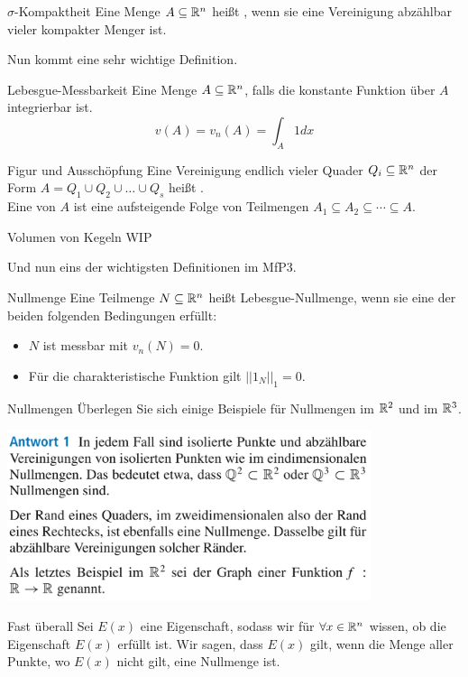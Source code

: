 \begin{Def}{$\sigma$-Kompaktheit}
    Eine Menge $A\subseteq \mathbb{R}^n$ heißt , wenn sie eine Vereinigung abzählbar vieler kompakter Menger ist.
\end{Def}
Nun kommt eine sehr wichtige Definition.
\begin{Def}{Lebesgue-Messbarkeit}
Eine Menge $A\subseteq \mathbb{R}^n$, falls die konstante Funktion über $A$ integrierbar ist.
$$v(A)=v_n(A)=\int_A 1dx$$
\end{Def}
\begin{Def}{Figur und Ausschöpfung}
Eine Vereinigung endlich vieler Quader $Q_i\subseteq \mathbb{R}^n$ der Form $A=Q_1\cup Q_2 \cup \dots \cup Q_s$ heißt . \\
Eine  von $A$ ist eine aufsteigende Folge von Teilmengen $A_1\subseteq A_2 \subseteq \cdots \subseteq A$.
\end{Def}
\begin{Beispiel}{Volumen von Kegeln}
WIP
\end{Beispiel}
Und nun eins der wichtigsten Definitionen im MfP3.
\begin{Def}{Nullmenge}
Eine Teilmenge $N\subseteq \mathbb{R}^n$ heißt Lebesgue-Nullmenge, wenn sie eine der beiden folgenden Bedingungen erfüllt:
\begin{itemize}
    \item $N$ ist messbar mit $v_n(N)=0$.
    \item Für die charakteristische Funktion gilt $||1_{N}||_1=0$.
\end{itemize}
\end{Def}
\begin{Beispiel}{Nullmengen}
Überlegen Sie sich einige Beispiele für Nullmengen im $\mathbb{R}^2$ und im $\mathbb{R}^3$.
\begin{center}
    \includegraphics[width=0.8\textwidth]{Dateien/Nullmengen.png}
\end{center}
\end{Beispiel}
\begin{Def}{Fast überall}
Sei $E(x)$ eine Eigenschaft, sodass wir für $\forall x \in \mathbb{R}^n$ wissen, ob die Eigenschaft $E(x)$ erfüllt ist. Wir sagen, dass $E(x)$  gilt, wenn die Menge aller Punkte, wo $E(x)$ nicht gilt, eine Nullmenge ist.
\end{Def}
